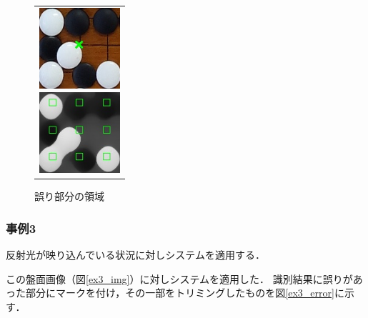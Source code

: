 \documentclass[openright]{nitocs}
\numberwithin{equation}{section}
\begin{document}
                \begin{figure}[tb] %
                    \begin{center}
                      \begin{tabular}{c}
                        \begin{minipage}{0.5\hsize}
                          \begin{center}
                            \includegraphics[clip,width=30mm]{DSC_0099/TRIM_resultCompare.jpg}
                        \caption{図\ref{ex2_img}の誤り部分}
                        \label{ex2_error}
                          \end{center}
                        \end{minipage}
                        \begin{minipage}{0.5\hsize}
                          \begin{center}
                            \includegraphics[clip,width=30mm]{DSC_0099/TRIM_boardWithAreaImg.jpg}
                        \caption{誤り部分の領域}
                        \label{ex2_error_area}
                          \end{center}
                        \end{minipage}
                      \end{tabular}
                    \end{center}
                \end{figure}
    
            \subsubsection{事例3} %
                反射光が映り込んでいる状況に対しシステムを適用する．

                この盤面画像（図\ref{ex3_img}）に対しシステムを適用した．
                識別結果に誤りがあった部分にマークを付け，その一部をトリミングしたものを図\ref{ex3_error}に示す．
\end{document}
